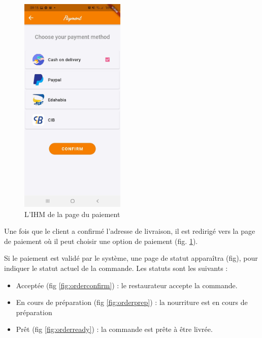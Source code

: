 \documentclass[french, a4paper, 12pt]{report}
\begin{document}
\newpage

		\begin{figure}[h!]
			\center
			\includegraphics[width=5cm]{screenshots/ClientViews/Payment.jpg}
			\caption{L'IHM de la page du paiement}
			\label{fig:clipay}
		\end{figure} Une fois que le client a confirmé l'adresse de livraison, il est redirigé vers la page de paiement où il peut choisir une option de paiement (fig. \ref{fig:clipay}).

\newpage

Si le paiement est validé par le système, une page de statut apparaîtra (fig), pour indiquer le statut actuel de la commande. Les statuts sont les suivants :


\begin{itemize}
	\item Acceptée (fig \ref{fig:orderconfirm}) : le restaurateur accepte la commande.
	\item En cours de préparation (fig \ref{fig:orderprep}) : la nourriture est en cours de préparation
	\item Prêt (fig \ref{fig:orderready}) : la commande est prête à être livrée.
\end{itemize}
\end{document}
